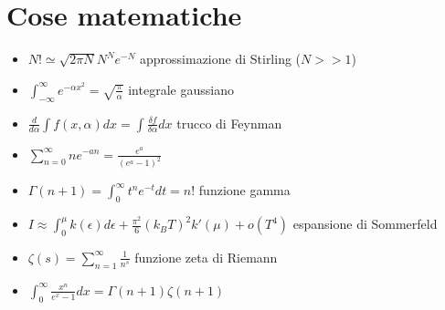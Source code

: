\documentclass[a4paper]{article}
\begin{document}
    \section{Cose matematiche}
        \begin{itemize}
            \item $N!\simeq\sqrt{2\pi N}N^Ne^{-N}$ approssimazione di Stirling ($N>>1$)
            \item $\int_{-\infty}^{\infty}e^{-\alpha x^2}=\sqrt{\frac{\pi}{\alpha}}$ integrale gaussiano
            \item $\frac{d}{d\alpha}\int f(x,\alpha)dx=\int\frac{\delta f}{\delta\alpha}dx$ trucco di Feynman
            \item $\sum_{n=0}^\infty ne^{-an}=\frac{e^a}{(e^a-1)^2}$
            \item $\Gamma(n+1)=\int_0^\infty t^{n}e^{-t}dt=n!$ funzione gamma
            \item $I\approx\int_0^\mu k(\epsilon)d\epsilon+\frac{\pi^2}{6}(k_BT)^2k'(\mu)+o(T^4)$ espansione di Sommerfeld
            \item $\zeta(s)=\sum_{n=1}^\infty\frac{1}{n^s}$ funzione zeta di Riemann
            \item $\int_0^\infty\frac{x^n}{e^x-1}dx=\Gamma(n+1)\zeta(n+1)$
        \end{itemize}
\end{document}
